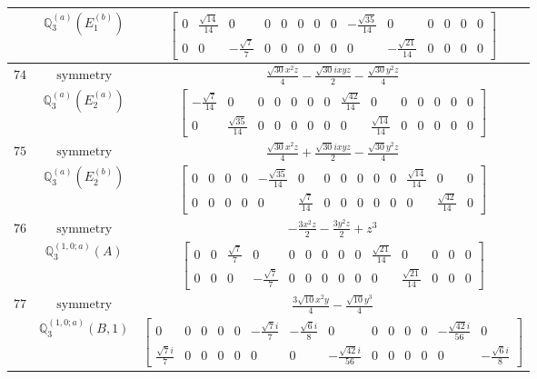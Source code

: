 \documentclass[fleqn,8pt,landscape]{jsarticle}
\begin{document}
\begin{longtable}{ccc}
$  $ & $ \mathbb{Q}_{3}^{(a)}(E_{1}^{(b)}) $ & $ \begin{bmatrix} 0 & \frac{\sqrt{14}}{14} & 0 & 0 & 0 & 0 & 0 & 0 & - \frac{\sqrt{35}}{14} & 0 & 0 & 0 & 0 & 0 \\ 0 & 0 & - \frac{\sqrt{7}}{7} & 0 & 0 & 0 & 0 & 0 & 0 & - \frac{\sqrt{21}}{14} & 0 & 0 & 0 & 0 \end{bmatrix} $ \\ \hline
$ 74 $ & $ \text{symmetry} $ & $ \frac{\sqrt{30} x^{2} z}{4} - \frac{\sqrt{30} i x y z}{2} - \frac{\sqrt{30} y^{2} z}{4} $ \\
$  $ & $ \mathbb{Q}_{3}^{(a)}(E_{2}^{(a)}) $ & $ \begin{bmatrix} - \frac{\sqrt{7}}{14} & 0 & 0 & 0 & 0 & 0 & 0 & \frac{\sqrt{42}}{14} & 0 & 0 & 0 & 0 & 0 & 0 \\ 0 & \frac{\sqrt{35}}{14} & 0 & 0 & 0 & 0 & 0 & 0 & \frac{\sqrt{14}}{14} & 0 & 0 & 0 & 0 & 0 \end{bmatrix} $ \\ \hline
$ 75 $ & $ \text{symmetry} $ & $ \frac{\sqrt{30} x^{2} z}{4} + \frac{\sqrt{30} i x y z}{2} - \frac{\sqrt{30} y^{2} z}{4} $ \\
$  $ & $ \mathbb{Q}_{3}^{(a)}(E_{2}^{(b)}) $ & $ \begin{bmatrix} 0 & 0 & 0 & 0 & - \frac{\sqrt{35}}{14} & 0 & 0 & 0 & 0 & 0 & 0 & \frac{\sqrt{14}}{14} & 0 & 0 \\ 0 & 0 & 0 & 0 & 0 & \frac{\sqrt{7}}{14} & 0 & 0 & 0 & 0 & 0 & 0 & \frac{\sqrt{42}}{14} & 0 \end{bmatrix} $ \\ \hline
$ 76 $ & $ \text{symmetry} $ & $ - \frac{3 x^{2} z}{2} - \frac{3 y^{2} z}{2} + z^{3} $ \\
$  $ & $ \mathbb{Q}_{3}^{(1,0;a)}(A) $ & $ \begin{bmatrix} 0 & 0 & \frac{\sqrt{7}}{7} & 0 & 0 & 0 & 0 & 0 & 0 & \frac{\sqrt{21}}{14} & 0 & 0 & 0 & 0 \\ 0 & 0 & 0 & - \frac{\sqrt{7}}{7} & 0 & 0 & 0 & 0 & 0 & 0 & \frac{\sqrt{21}}{14} & 0 & 0 & 0 \end{bmatrix} $ \\ \hline
$ 77 $ & $ \text{symmetry} $ & $ \frac{3 \sqrt{10} x^{2} y}{4} - \frac{\sqrt{10} y^{3}}{4} $ \\
$  $ & $ \mathbb{Q}_{3}^{(1,0;a)}(B,1) $ & $ \begin{bmatrix} 0 & 0 & 0 & 0 & 0 & - \frac{\sqrt{7} i}{7} & - \frac{\sqrt{6} i}{8} & 0 & 0 & 0 & 0 & 0 & - \frac{\sqrt{42} i}{56} & 0 \\ \frac{\sqrt{7} i}{7} & 0 & 0 & 0 & 0 & 0 & 0 & - \frac{\sqrt{42} i}{56} & 0 & 0 & 0 & 0 & 0 & - \frac{\sqrt{6} i}{8} \end{bmatrix} $ \\ \hline

\end{longtable}
\end{document}
